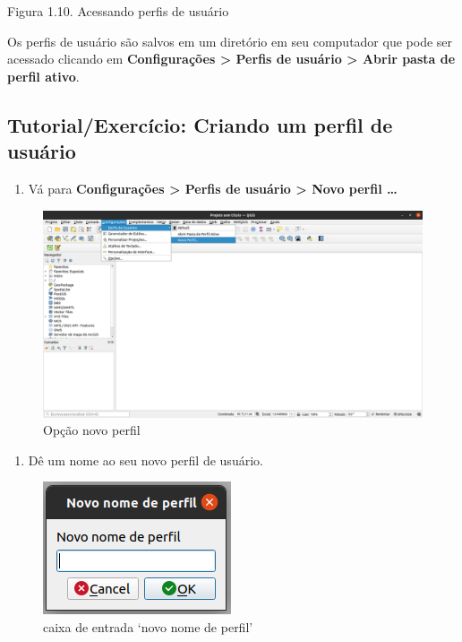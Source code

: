 \documentclass[
]{krantz}
\providecommand{\tightlist}{%
  \setlength{\itemsep}{0pt}\setlength{\parskip}{0pt}}
\begin{document}
Figura 1.10. Acessando perfis de usuário

Os perfis de usuário são salvos em um diretório em seu computador que pode ser acessado clicando em \textbf{Configurações \textgreater{} Perfis de usuário \textgreater{} Abrir pasta de perfil ativo}.

\hypertarget{tutorialexercuxedcio-criando-um-perfil-de-usuuxe1rio}{%
\subsection{Tutorial/Exercício: Criando um perfil de usuário}\label{tutorialexercuxedcio-criando-um-perfil-de-usuuxe1rio}}

\begin{enumerate}
\def\labelenumi{\arabic{enumi}.}
\tightlist
\item
  Vá para \textbf{Configurações \textgreater{} Perfis de usuário \textgreater{} Novo perfil \ldots{}}
\end{enumerate}

\begin{figure}
\centering
\includegraphics{media/modulo1/user-profiles-2.png}
\caption{Opção novo perfil}
\end{figure}

\begin{enumerate}
\def\labelenumi{\arabic{enumi}.}
\setcounter{enumi}{1}
\tightlist
\item
  Dê um nome ao seu novo perfil de usuário.
\end{enumerate}

\begin{figure}
\centering
\includegraphics{media/modulo1/user-profiles-3.png}
\caption{caixa de entrada `novo nome de perfil'}
\end{figure}
\end{document}
